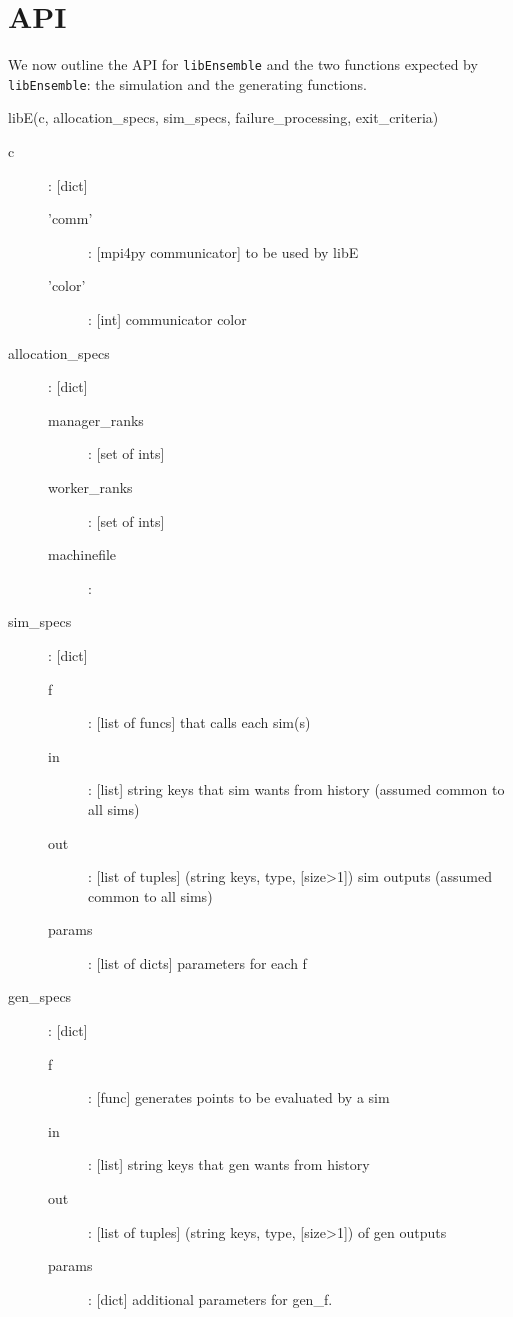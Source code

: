 \documentclass{article}
\newenvironment{allintypewriter}{\ttfamily}{\par}
\newcommand{\libE}{\texttt{libEnsemble}\xspace}
\begin{document}
\section{API}
We now outline the API for \libE and the two functions expected by \libE: the
simulation and the generating functions.

\begin{allintypewriter}
  libE(c, allocation\_specs, sim\_specs, failure\_processing, exit\_criteria)\\

  \begin{description}
    \item[c]: [dict] 
      \begin{description}
        \item['comm']: [mpi4py communicator] to be used by libE
        \item['color']: [int] communicator color
      \end{description}

    \item[allocation\_specs]: [dict]
      \begin{description}
        \item[manager\_ranks]: [set of ints] 
        \item[worker\_ranks]: [set of ints]
        \item[machinefile]:
      \end{description}

    \item[sim\_specs]: [dict] 
      \begin{description}
        \item[f]: [list of funcs] that calls each sim(s)
        \item[in]: [list] string keys that sim wants from history (assumed common to all sims)
        \item[out]: [list of tuples] (string keys, type, [size>1]) sim outputs (assumed common to all sims)
        \item[params]: [list of dicts] parameters for each f
      \end{description}

    \item[gen\_specs]: [dict] 
      \begin{description}
        \item[f]: [func] generates points to be evaluated by a sim
        \item[in]: [list] string keys that gen wants from history
        \item[out]: [list of tuples] (string keys, type, [size>1]) of gen outputs
        \item[params]: [dict] additional parameters for gen\_f. 
      \end{description}


\end{description}
\end{allintypewriter}
\end{document}

